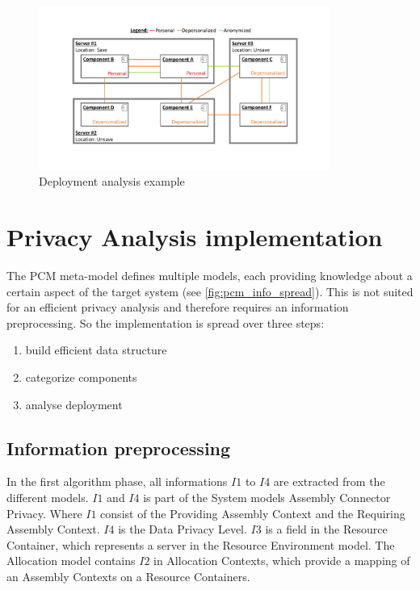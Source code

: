 \begin{figure}[h]
	\centering
	\includegraphics[trim = 35mm 30mm 30mm 25mm, clip, width=0.85\textwidth]{graphs/deployment_example_implementation_eval}
	\caption{Deployment analysis example}
	\label{fig:example_deplyoment_eval}
\end{figure}


\section{Privacy Analysis implementation}
\label{sec:PrivacyAnalysis:implementation}

The PCM meta-model defines multiple models, each providing knowledge about a certain aspect of the target system (see \autoref{fig:pcm_info_spread}). This is not suited for an efficient privacy analysis and therefore requires an information preprocessing. So the implementation is spread over three steps:

\begin{enumerate}
	\label{enum:algorithm_steps}
	\setlength\itemsep{0em}
	\item build efficient data structure
	\item categorize components
	\item analyse deployment
\end{enumerate}


\subsection{Information preprocessing}

In the first algorithm phase, all informations $I1$ to $I4$ are extracted from the different models. $I1$ and $I4$ is part of the System models Assembly Connector Privacy. Where $I1$ consist of the Providing Assembly Context and the Requiring Assembly Context. $I4$ is the Data Privacy Level. $I3$ is a field in the Resource Container, which represents a server in the Resource Environment model. The Allocation model contains $I2$ in Allocation Contexts, which provide a mapping of an Assembly Contexts on a Resource Containers.

